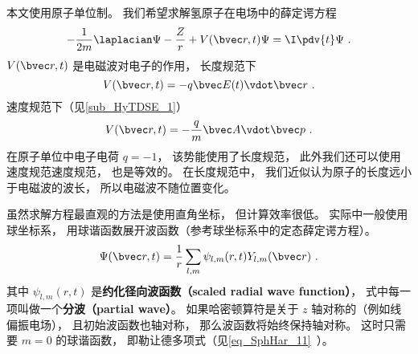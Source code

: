 

本文使用原子单位制。 我们希望求解氢原子在电场中的薛定谔方程
\begin{equation}\label{eq_HyTDSE_7}
-\frac{1}{2m}\laplacian \Psi -\frac{Z}{r}+ V(\bvec r, t)\Psi = \I \pdv{t}\Psi~.
\end{equation}
$V(\bvec r, t)$ 是电磁波对电子的作用， 长度规范下
\begin{equation}\label{eq_HyTDSE_8}
V(\bvec r, t) =  - q\bvec E(t) \vdot \bvec r~.
\end{equation}
速度规范下（见\autoref{sub_HyTDSE_1}）
\begin{equation}
V(\bvec r, t) =  -\frac{q}{m} \bvec A\vdot\bvec p~.
\end{equation}
在原子单位中电子电荷 $q = -1$， 该势能使用了长度规范， 此外我们还可以使用速度规范速度规范， 也是等效的。 在长度规范中， 我们近似认为原子的长度远小于电磁波的波长， 所以电磁波不随位置变化。

虽然求解方程最直观的方法是使用直角坐标， 但计算效率很低。 实际中一般使用球坐标系， 用球谐函数展开波函数（参考球坐标系中的定态薛定谔方程）。
\begin{equation}\label{eq_HyTDSE_3}
\Psi(\bvec r, t) = \frac{1}{r}\sum_{l,m} \psi_{l,m}(r, t) Y_{l,m}(\bvec r)~.
\end{equation}
其中 $\psi_{l,m}(r, t)$ 是\textbf{约化径向波函数（scaled radial wave function）}， 式中每一项叫做一个\textbf{分波（partial wave）}。 如果哈密顿算符是关于 $z$ 轴对称的（例如线偏振电场）， 且初始波函数也轴对称， 那么波函数将始终保持轴对称。 这时只需要 $m = 0$ 的球谐函数， 即勒让德多项式（见\autoref{eq_SphHar_11}~）。

